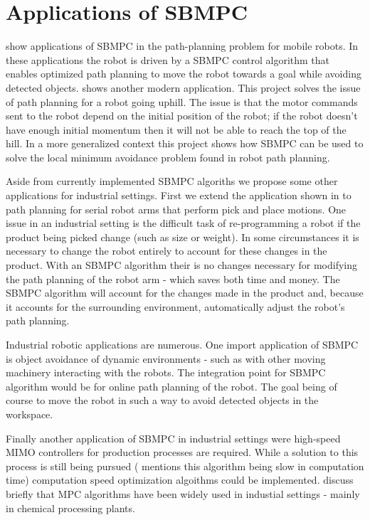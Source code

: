 \documentclass[main.tex]{subfile}
\begin{document}
\section{Applications of SBMPC} 
\label{sec:applications_of_sbmpc}

\cite{autoVehicle,auv} show applications of SBMPC in the path-planning problem
for mobile robots. In these applications the robot is driven by a SBMPC control
algorithm that enables optimized path planning to move the robot towards a goal
while avoiding detected objects. \cite{uphill} shows another modern application.
This project solves the issue of path planning for a robot going uphill. The
issue is that the motor commands sent to the robot depend on the initial
position of the robot; if the robot doesn't have enough initial momentum then it
will not be able to reach the top of the hill. In a more generalized context
this project shows how SBMPC can be used to solve the local minimum avoidance
problem found in robot path planning.

Aside from currently implemented SBMPC algoriths we propose some other
applications for industrial settings. First we extend the application shown in
\cite{uphill} to path planning for serial robot arms that perform pick and place
motions. One issue in an industrial setting is the difficult task of
re-programming a robot if the product being picked change (such as size or
weight). In some circumstances it is necessary to change the robot entirely to
account for these changes in the product. With an SBMPC algorithm their is no
changes necessary for modifying the path planning of the robot arm - which saves
both time and money. The SBMPC algorithm will account for the changes made in
the product and, because it accounts for the surrounding environment,
automatically adjust the robot's path planning.

Industrial robotic applications are numerous. One import application of SBMPC is
object avoidance of dynamic environments - such as with other moving machinery
interacting with the robots. The integration point for SBMPC algorithm would be
for online path planning of the robot. The goal being of course to move the
robot in such a way to avoid detected objects in the workspace. 

Finally another application of SBMPC in industrial settings were high-speed MIMO
controllers for production processes are required. While a solution to this
process is still being pursued (\cite{autoVehicle} mentions this algorithm being
slow in computation time) computation speed optimization algoithms could be
implemented. \cite{uphill,auv} discuss briefly that MPC algorithms have been
widely used in industial settings - mainly in chemical processing plants.

\end{document}
